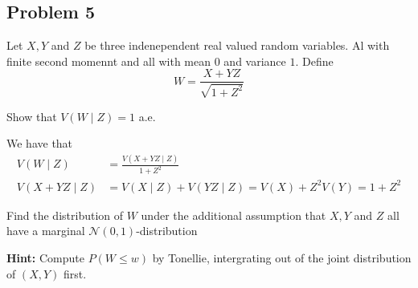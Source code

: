 \subsection{Problem 5} %
\label{sub:problem_5}
Let \(X,Y\) and \(Z\) be three indenependent real valued random variables. Al with finite second momennt and all with mean \(0\) and variance \(1\). Define
\[
	W= \frac{X+YZ}{\sqrt{1+Z^2}}
\]
\begin{problem}
Show that \(V(W\mid Z)=1\) a.e.
\end{problem}
\begin{solution}
We have that
\begin{align}
    V(W\mid Z) & = \frac{V(X+YZ\mid Z)}{1+Z^2} \\
    V(X+YZ\mid Z) & =  V(X\mid Z)+ V(YZ\mid Z) = V(X) + Z^2V(Y)=1+Z^2
\end{align}
\end{solution}
\begin{problem}
Find the distribution of \(W\) under the additional assumption that \(X,Y\) and \(Z\) all have a marginal \(\mathcal{N}(0,1)\)-distribution

\textbf{Hint:} Compute \(P(W \leq w )\) by Tonellie, intergrating out of the joint distribution of \((X,Y)\) first.
\end{problem}
